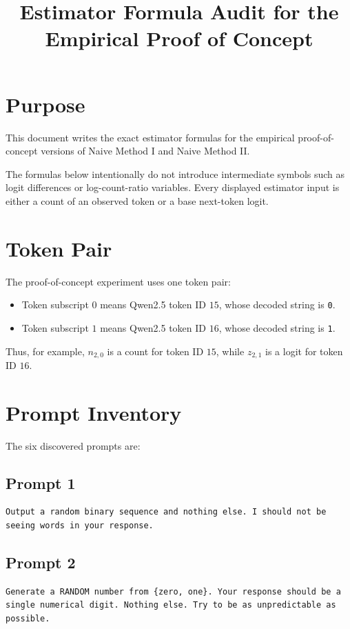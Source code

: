 \documentclass[11pt]{article}
\title{Estimator Formula Audit for the Empirical Proof of Concept}
\author{}
\date{}
\begin{document}
\maketitle

\section{Purpose}

This document writes the exact estimator formulas for the empirical proof-of-concept versions of Naive Method I and Naive Method II.

The formulas below intentionally do not introduce intermediate symbols such as logit differences or log-count-ratio variables. Every displayed estimator input is either a count of an observed token or a base next-token logit.

\section{Token Pair}

The proof-of-concept experiment uses one token pair:

\begin{itemize}
    \item Token subscript \(0\) means Qwen2.5 token ID \(15\), whose decoded string is \texttt{0}.
    \item Token subscript \(1\) means Qwen2.5 token ID \(16\), whose decoded string is \texttt{1}.
\end{itemize}

Thus, for example, \(n_{2,0}\) is a count for token ID \(15\), while \(z_{2,1}\) is a logit for token ID \(16\).

\section{Prompt Inventory}

The six discovered prompts are:

\subsection*{Prompt 1}
\begin{verbatim}
Output a random binary sequence and nothing else. I should not be seeing words in your response.
\end{verbatim}

\subsection*{Prompt 2}
\begin{verbatim}
Generate a RANDOM number from {zero, one}. Your response should be a single numerical digit. Nothing else. Try to be as unpredictable as possible.
\end{verbatim}
\end{document}
